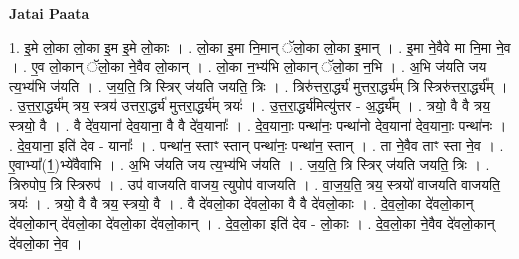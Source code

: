 \documentclass[17pt]{extarticle}
\begin{document}
\textbf{Jatai Paata} \newline

1. इ॒मे लो॒का लो॒का इ॒म इ॒मे लो॒काः । . लो॒का इ॒मा नि॒मान् ॅलो॒का लो॒का इ॒मान् । . इ॒मा ने॒वैवे मा नि॒मा ने॒व । . ए॒व लो॒कान् ॅलो॒का ने॒वैव लो॒कान् । . लो॒का न॒भ्य॑भि लो॒कान् ॅलो॒का न॒भि । . अ॒भि ज॑यति जय त्य॒भ्य॑भि ज॑यति । . ज॒य॒ति॒ त्रि स्त्रिर् ज॑यति जयति॒ त्रिः । . त्रिरु॑त्तरा॒र्द्ध्य॑ मुत्तरा॒र्द्ध्य॑म् त्रि स्त्रिरु॑त्तरा॒र्द्ध्य᳚म् । . उ॒त्त॒रा॒र्द्ध्य॑म् त्रय॒ स्त्रय॑ उत्तरा॒र्द्ध्य॑ मुत्तरा॒र्द्ध्य॑म् त्रयः॑ । . उ॒त्त॒रा॒र्द्ध्य॑मित्यु॑त्तर - अ॒र्द्ध्य᳚म् । . त्रयो॒ वै वै त्रय॒ स्त्रयो॒ वै । . वै दे॑व॒याना॑ देव॒याना॒ वै वै दे॑व॒यानाः᳚ । . दे॒व॒यानाः॒ पन्था॑नः॒ पन्था॑नो देव॒याना॑ देव॒यानाः॒ पन्था॑नः । . दे॒व॒याना॒ इति॑ देव - यानाः᳚ । . पन्था॑न॒ स्ताꣳ स्तान् पन्था॑नः॒ पन्था॑न॒ स्तान् । . ता ने॒वैव ताꣳ स्ता ने॒व । . ए॒वाभ्या᳚(1॒)भ्ये॑वैवाभि । . अ॒भि ज॑यति जय त्य॒भ्य॑भि ज॑यति । . ज॒य॒ति॒ त्रि स्त्रिर् ज॑यति जयति॒ त्रिः । . त्रिरुपोप॒ त्रि स्त्रिरुप॑ । . उप॑ वाजयति वाजय॒ त्युपोप॑ वाजयति । . वा॒ज॒य॒ति॒ त्रय॒ स्त्रयो॑ वाजयति वाजयति॒ त्रयः॑ । . त्रयो॒ वै वै त्रय॒ स्त्रयो॒ वै । . वै दे॑वलो॒का दे॑वलो॒का वै वै दे॑वलो॒काः । . दे॒व॒लो॒का दे॑वलो॒कान् दे॑वलो॒कान् दे॑वलो॒का दे॑वलो॒का दे॑वलो॒कान् । . दे॒व॒लो॒का इति॑ देव - लो॒काः । . दे॒व॒लो॒का ने॒वैव दे॑वलो॒कान् दे॑वलो॒का ने॒व । \newline
\end{document}
